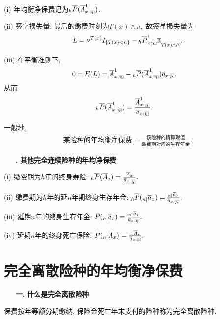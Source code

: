 \documentclass[a4paper,openany, 10pt]{ctexbook}
\makeatletter
\newcommand{\hei}{\CJKfamily{hei}}      %
\DeclareRobustCommand{\annu}[1]{_{%
    \def\arraystretch{0}%
    \setlength\arraycolsep{1pt}%
    \setlength\arrayrulewidth{.2pt}%
    \begin{array}[b]{@{}c|}\hline
        \\[\arraycolsep]%
        \scriptstyle #1%
    \end{array}%
}}
\makeatother
\begin{document}
(i) 年均衡净保费记为${}_{h}\overline{P}(\overline{A}^{1}_{x:
}{}_{\annu n})$.

(ii) 签字损失量: 最后的缴费时刻为$T(x)\land h,$ 故签单损失量为
$$L=\nu^{T(x)}I_{\{T(x)<n\}}-{}_{h}\overline{P}^{1}_{x:}{}_{\annu n}\overline{a}_{\annu{T(x)\land h}}.$$

(iii) 在平衡准则下,
\begin{align*}
0 &= E(L) = \overline{A}^{1}_{x:}{}_{\annu n} - {}_{h}\overline{P}(\overline{A}^{1}_{x:}{}_{\annu n}) \overline{a}_{x: }{}{\annu{h}}.
\end{align*}
从而
\begin{align*}
& {}_{h}\overline{P}(\overline{A}^{1}_{x:}{}_{\annu n})=\frac{\overline{A}^{1}_{x:}{}_{\annu n}}{\overline{a}_{x:}{}{\annu{h}}}.
\end{align*}
\begin{remark} 一般地,
  \begin{align*}
\text{某险种的年均衡净保费}=\frac{\text{该险种的精算现值}}{\text{缴费期对应的生存年金}}.
\end{align*}
\end{remark}

\begin{itemize}
  \item[{\bf\heiti 4.}] {\bf\heiti 其他完全连续险种的年均净保费}
\end{itemize}

(i) 缴费期为$h$年的终身寿险: $_{h}\overline{P}(\overline{A}_{x})=\frac{\overline{A}_{x}}{\overline{a}_{x:}{}\annu h}.$

(ii) 缴费期为$h$年的延$n$年期终身生存年金: $_{h}\overline{P}(_{n|}\overline{a}_{x})=\frac{_{n|}\overline{a}_{x}}{\overline{a}_{x:}{}{\annu h}}.$

(iii) 延期$n$年的终身生存年金: $\overline{P}(_{n|}\overline{a}_{x})=\frac{_{n|}\overline{a}_{x}}{\overline{a}_{x:}{}\annu n}.$

(iv) 延期$n$年的终身死亡保险: $\overline{P}(_{n|}\overline{A}_{x})=\frac{_{n}\overline{A}_{x}}{\overline{a}_{x:}{}\annu n}.$

\section{完全离散险种的年均衡净保费}
\begin{itemize}
    \item[{\bf\hei 一.}]{\bf\hei 什么是完全离散险种}
\end{itemize}
保费按年等额分期缴纳, 保险金死亡年末支付的险种称为完全离散险种.
\end{document}
